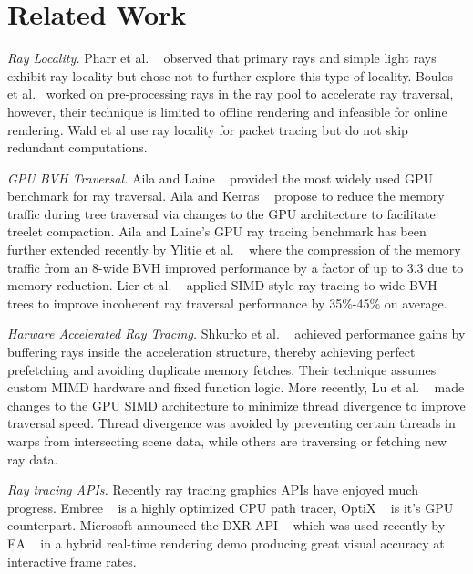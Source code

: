 \section{Related Work}

\textit{Ray Locality.} Pharr et al. ~\cite{Pharr:1997:RCS:258734.258791} observed that primary rays and simple light rays exhibit ray locality but chose not to further explore this type of locality. Boulos et al.~\cite{Boulos2008AdaptiveRP} worked on pre-processing rays in the ray pool to accelerate ray traversal, however, their technique is limited to offline rendering and infeasible for online rendering. Wald et al \cite{doi:10.1111/1467-8659.00508, Wald07simdray} use ray locality for packet tracing but do not skip redundant computations.

\textit{GPU BVH Traversal.} Aila and Laine ~\cite{Aila:2009:UER:1572769.1572792} provided the most widely used GPU benchmark for ray traversal. Aila and Kerras ~\cite{Aila:2010:ACT:1921479.1921497} propose to reduce the memory traffic during tree traversal via changes to the GPU architecture to facilitate treelet compaction. Aila and Laine's GPU ray tracing benchmark has been further extended recently by Ylitie et al. ~\cite{Ylitie:2017:EIR:3105762.3105773} where the compression of the memory traffic from an 8-wide BVH improved performance by a factor of up to 3.3 due to memory reduction. Lier et al. ~\cite{Lier:2018:CSR:3231578.3231583} applied SIMD style ray tracing to wide BVH trees to improve incoherent ray traversal performance by 35\%-45\% on average. 

\textit{Harware Accelerated Ray Tracing.} Shkurko et al. ~\cite{Shkurko:2017:DSH:3105762.3105771} achieved performance gains by buffering rays inside the acceleration structure, thereby achieving perfect prefetching and avoiding duplicate memory fetches. Their technique assumes custom MIMD hardware and fixed function logic. More recently, Lu et al. ~\cite{Lu:2017:UPG:3123939.3124532} made changes to the GPU SIMD architecture to minimize thread divergence to improve traversal speed. Thread divergence was avoided by preventing certain threads in warps from intersecting scene data, while others are traversing or fetching new ray data.

\textit{Ray tracing APIs.} Recently ray tracing graphics APIs have enjoyed much progress. Embree ~\cite{Wald:2014:EKF:2601097.2601199} is a highly optimized CPU path tracer, OptiX ~\cite{Parker:2010:OGP:1833349.1778803} is it's GPU counterpart. Microsoft announced the DXR API ~\cite{MicrosoftDXR} which was used recently by EA ~\cite{Haines2019} in a hybrid real-time rendering demo producing great visual accuracy at interactive frame rates.

